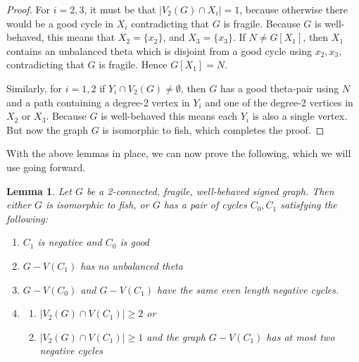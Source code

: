 \documentclass[12pt]{article}
\newtheorem{lemma}[theorem]{Lemma}
\begin{document}
\begin{proof}
    For $ i = 2,3$, it must be that $|V_2(G) \cap X_i| = 1$, because otherwise there would be a good cycle in $X_i$ contradicting that $G$ is fragile. Because $G$ is well-behaved, this means that $X_2 = \{x_2\}$, and $X_3 = \{x_3\}$. If $N \neq G[X_1]$, then $X_1$ contains an unbalanced theta which is disjoint from a good cycle using $x_2, x_3$, contradicting that $G$ is fragile. Hence $G[X_1] = N$.
    
    Similarly, for $i = 1,2$ if $Y_i \cap V_2(G) \neq \emptyset$, then $G$ has a good theta-pair using $N$ and a path containing a degree-2 vertex in $Y_i$ and one of the degree-2 vertices in $X_2$ or $X_3$. Because $G$ is well-behaved this means each $Y_i$ is also a single vertex. But now the graph $G$ is isomorphic to fish, which completes the proof.
    \end{proof}

With the above lemmas in place, we can now prove the following, which we will use going forward.

\begin{lemma}\label{theBeast}
    Let $G$ be a 2-connected, fragile, well-behaved signed graph. Then either $G$ is isomorphic to fish, or $G$ has a pair of cycles $C_0,C_1$ satisfying the following:
     \begin{enumerate}
        \item\label{g1} $C_1$ is negative and $C_0$ is good
        \item\label{g2} $G - V(C_1)$ has no unbalanced theta
        \item\label{g3} $G - V(C_0)$ and $G - V(C_1)$ have the same even length negative cycles.
        \item\label{g4} \begin{enumerate}
            \item $|V_2(G) \cap V(C_1)| \ge 2$ or
            \item $|V_2(G) \cap V(C_1)| \ge 1$ and the graph $G - V(C_1)$ has at most two negative cycles
            \end{enumerate}
    \end{enumerate}
\end{lemma}
\end{document}
